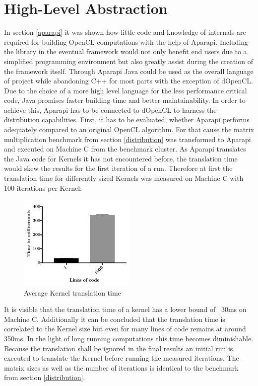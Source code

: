 \section{High-Level Abstraction}
\label{abstraction}

In section \ref{aparapi} it was shown how little code and knowledge of internals are required for building OpenCL computations with the help of Aparapi. Including the library in the eventual framework would not only benefit end users due to a simplified programming environment but also greatly assist during the creation of the framework itself. Through Aparapi Java could be used as the overall language of project while abandoning C++ for most parts with the exception of dOpenCL. Due to the choice of a more high level language for the less performance critical code, Java promises faster building time and better maintainability. In order to achieve this, Aparapi has to be connected to dOpenCL to harness the distribution capabilities. First, it has to be evaluated, whether Aparapi performs adequately compared to an original OpenCL algorithm. For that cause the matrix multiplication benchmark from section \ref{distribution} was transformed to Aparapi and executed on Machine C from the benchmark cluster. As Aparapi translates the Java code for Kernels it has not encountered before, the translation time would skew the results for the first iteration of a run. Therefore at first the translation time for differently sized Kernels was measured on Machine C with 100 iterations per Kernel:

\begin{figure}[H]
	\includegraphics[width=0.5\textwidth]{images/aparapi_translation.pdf}
	\centering
	\caption{Average Kernel translation time}
	\label{img:aparapi_translation}
\end{figure}

It is visible that the translation time of a kernel has a lower bound of ~30ms on Machine C. Additionally it can be concluded that the translation time is correlated to the Kernel size but even for many lines of code remains at around 350ms. In the light of long running computations this time becomes diminishable. Because the translation shall be ignored in the final results an initial run is executed to translate the Kernel before running the measured iterations. The matrix sizes as well as the number of iterations is identical to the benchmark from section \ref{distribution}.

